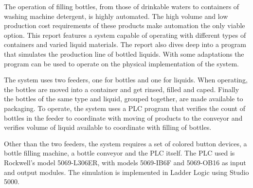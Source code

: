 The operation of filling bottles, from those of drinkable waters to containers of washing machine detergent, is highly automated. The high volume and low production cost requirements of these products make automation the only viable option. This report features a system capable of operating with different types of containers and varied liquid materials. The report also dives deep into a program that simulates the production line of bottled liquids. With some adaptations the program can be used to operate on the physical implementation of the system.

The system uses two feeders, one for bottles and one for liquids. When operating, the bottles are moved into a container and get rinsed, filled and caped. Finally the bottles of the same type and liquid, grouped together, are made available to packaging. To operate, the system uses a PLC program that verifies the count of bottles in the feeder to coordinate with moving of products to the conveyor and verifies volume of liquid available to coordinate with filling of bottles.

Other than the two feeders, the system requires a set of colored button devices, a bottle filling machine, a bottle conveyor and the PLC itself. The PLC used is Rockwell's model 5069-L306ER, with models 5069-IB6F and 5069-OB16 as input and output modules. The simulation is implemented in Ladder Logic using Studio 5000.
